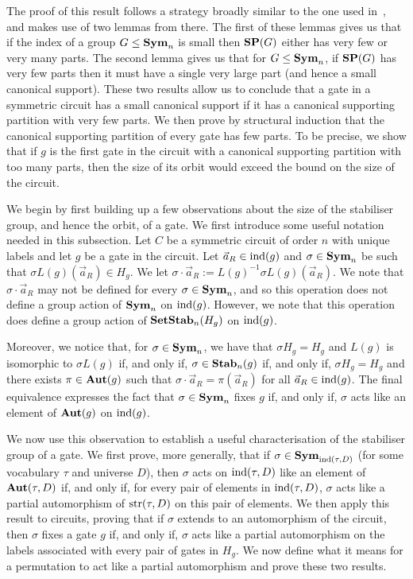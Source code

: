 \documentclass[../paper.tex]{subfiles}
\begin{document}
The proof of this result follows a strategy broadly similar to the one used
in~\cite{AndersonD17}, and makes use of two lemmas from there. The first of
these lemmas gives us that if the index of a group $G \leq \text{\textbf{Sym}}_n$ is small then
$\text{\textbf{SP}}(G)$ either has very few or very many parts. The second lemma gives us that
for $G \leq \text{\textbf{Sym}}_n$, if $\text{\textbf{SP}}(G)$ has very few parts then it must have a single
very large part (and hence a small canonical support). These two results allow
us to conclude that a gate in a symmetric circuit has a small canonical support
if it has a canonical supporting partition with very few parts. We then prove by
structural induction that the canonical supporting partition of every gate has
few parts. To be precise, we show that if $g$ is the first gate in the circuit
with a canonical supporting partition with too many parts, then the size of its
orbit would exceed the bound on the size of the circuit.

We begin by first building up a few observations about the size of the
stabiliser group, and hence the orbit, of a gate. We first introduce some useful
notation needed in this subsection. Let $C$ be a symmetric circuit of order $n$
with unique labels and let $g$ be a gate in the circuit. Let $\vec{a}_R \in
\text{\upshape ind}(g)$ and $\sigma \in \text{\textbf{Sym}}_n$ be such that $\sigma L(g)(\vec{a}_R) \in H_g$.
We let $\sigma \cdot \vec{a}_R := L(g)^{-1}\sigma L(g)(\vec{a}_R)$. We note that
$\sigma \cdot \vec{a}_R$ may not be defined for every $\sigma \in \text{\textbf{Sym}}_n$, and
so this operation does not define a group action of $\text{\textbf{Sym}}_n$ on $\text{\upshape ind}(g)$.
However, we note that this operation does define a group action of
$\text{\textbf{SetStab}}_n(H_g)$ on $\text{\upshape ind}(g)$.

Moreover, we notice that, for $\sigma \in \text{\textbf{Sym}}_n$, we have that $\sigma H_g =
H_g$ and $L(g)$ is isomorphic to $\sigma L(g)$ if, and only if, $\sigma \in
\text{\textbf{Stab}}_n(g)$ if, and only if, $\sigma H_g = H_g$ and there exists $\pi \in
\text{\textbf{Aut}}(g)$ such that $\sigma \cdot \vec{a}_R = \pi (\vec{a}_R)$ for all $\vec{a}_R
\in \text{\upshape ind}(g)$. The final equivalence expresses the fact that $\sigma \in \text{\textbf{Sym}}_n$
fixes $g$ if, and only if, $\sigma$ acts like an element of $\text{\textbf{Aut}}(g)$ on
$\text{\upshape ind}(g)$.

We now use this observation to establish a useful characterisation of the
stabiliser group of a gate. We first prove, more generally, that if $\sigma \in
\text{\textbf{Sym}}_{\text{\upshape ind}(\tau, D)}$ (for some vocabulary $\tau$ and universe $D$), then
$\sigma$ acts on $\text{\upshape ind}(\tau, D)$ like an element of $\text{\textbf{Aut}}(\tau, D)$ if, and only
if, for every pair of elements in $\text{\upshape ind}(\tau, D)$, $\sigma$ acts like a partial
automorphism of $\text{str}(\tau, D)$ on this pair of elements. We then apply this
result to circuits, proving that if $\sigma$ extends to an automorphism of the
circuit, then $\sigma$ fixes a gate $g$ if, and only if, $\sigma$ acts like a
partial automorphism on the labels associated with every pair of gates in $H_g$.
We now define what it means for a permutation to act like a partial automorphism
and prove these two results.
\end{document}
